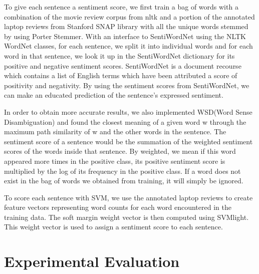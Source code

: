 \documentclass{article}
\begin{document}
To give each sentence a sentiment score, we first train a bag of words with a combination of the movie review corpus from nltk and a portion of the annotated laptop reviews from Stanford SNAP library with all the unique words stemmed by using Porter Stemmer. With an interface to SentiWordNet using the NLTK WordNet classes, for each sentence, we split it into individual words and for each word in that sentence, we look it up in the SentiWordNet dictionary for its positive and negative sentiment scores. SentiWordNet is a document recourse which contains a list of English terms which have been attributed a score of positivity and negativity. By using the sentiment scores from SentiWordNet, we can make an educated prediction of the sentence’s expressed sentiment. 

In order to obtain more accurate results, we also implemented WSD(Word Sense Disambiguation) and found the closest meaning of a given word w through the maximum path similarity of w and the other words in the sentence. The sentiment score of a sentence would be the summation of the weighted sentiment scores of the words inside that sentence. By weighted, we mean if this word appeared more times in the positive class, its positive sentiment score is multiplied by the log of its frequency in the positive class. If a word does not exist in the bag of words we obtained from training, it will simply be ignored.

To score each sentence with SVM, we use the annotated laptop reviews to create feature vectors representing word counts for each word encountered in the training data. The soft margin weight vector is then computed using SVMlight. This weight vector is used to assign a sentiment score to each sentence. 


\section{Experimental Evaluation} 
\end{document}
